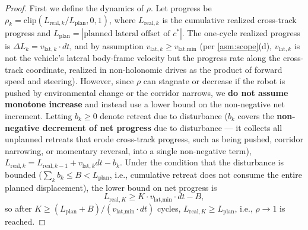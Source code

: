 \begin{proof}
First we define the dynamics of $\rho$. Let progress be $\rho_k = \mathrm{clip}(L_{\text{real},k}/L_{\text{plan}}, 0, 1)$, where $L_{\text{real},k}$ is the cumulative realized cross-track progress and $L_{\text{plan}} = |\text{planned lateral offset of } c^*|$. The one-cycle realized progress is $\Delta L_k = v_{\text{lat},k} \cdot dt$, and by assumption $v_{\text{lat},k} \ge v_{\text{lat,min}}$ (per \cref{asm:scope}(d), $v_{\text{lat},k}$ is not the vehicle's lateral body-frame velocity but the progress rate along the cross-track coordinate, realized in non-holonomic drives as the product of forward speed and steering). However, since $\rho$ can stagnate or decrease if the robot is pushed by environmental change or the corridor narrows, we \textbf{do not assume monotone increase} and instead use a lower bound on the non-negative net increment. Letting $b_k \ge 0$ denote retreat due to disturbance ($b_k$ covers the \textbf{non-negative decrement of net progress} due to disturbance --- it collects all unplanned retreats that erode cross-track progress, such as being pushed, corridor narrowing, or momentary reversal, into a single non-negative term), $L_{\text{real},k} = L_{\text{real},k-1} + v_{\text{lat},k} dt - b_k$. Under the condition that the disturbance is bounded ($\sum_k b_k \le B < L_{\text{plan}}$, i.e., cumulative retreat does not consume the entire planned displacement), the lower bound on net progress is
\begin{equation}
L_{\text{real},K} \ge K \cdot v_{\text{lat,min}} \cdot dt - B,
\end{equation}
so after $K \ge (L_{\text{plan}} + B)/(v_{\text{lat,min}} \cdot dt)$ cycles, $L_{\text{real},K} \ge L_{\text{plan}}$, i.e., $\rho \to 1$ is reached.


\end{proof}
